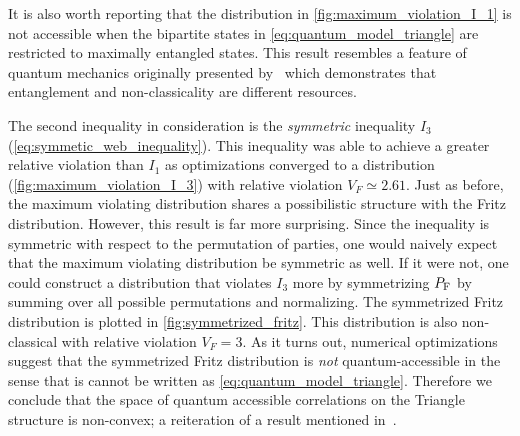 \documentclass[aps, 10pt, english, twoside, pra, nofootinbib, tightenlines, longbibliography, superscriptaddress]{revtex4-1}
\begin{document}
    It is also worth reporting that the distribution in \cref{fig:maximum_violation_I_1} is not accessible when the bipartite states in \cref{eq:quantum_model_triangle} are restricted to maximally entangled states. This result resembles a feature of quantum mechanics originally presented by~\citet{Methot_2006} which demonstrates that entanglement and non-classicality are different resources.



    The second inequality in consideration is the \textit{symmetric} inequality $I_3$ (\cref{eq:symmetic_web_inequality}). This inequality was able to achieve a greater relative violation than $I_1$ as optimizations converged to a distribution (\cref{fig:maximum_violation_I_3}) with relative violation $V_F \simeq 2.61$. Just as before, the maximum violating distribution shares a possibilistic structure with the Fritz distribution. However, this result is far more surprising. Since the inequality is symmetric with respect to the permutation of parties, one would naively expect that the maximum violating distribution be symmetric as well. If it were not, one could construct a distribution that violates $I_3$ more by symmetrizing $\prob[\fritz]$ by summing over all possible permutations and normalizing. The symmetrized Fritz distribution is plotted in \cref{fig:symmetrized_fritz}. This distribution is also non-classical with relative violation $V_F = 3$. As it turns out, numerical optimizations suggest that the symmetrized Fritz distribution is \textit{not} quantum-accessible in the sense that is cannot be written as \cref{eq:quantum_model_triangle}. Therefore we conclude that the space of quantum accessible correlations on the Triangle structure is non-convex; a reiteration of a result mentioned in~\citet{Inflation}.
\end{document}
